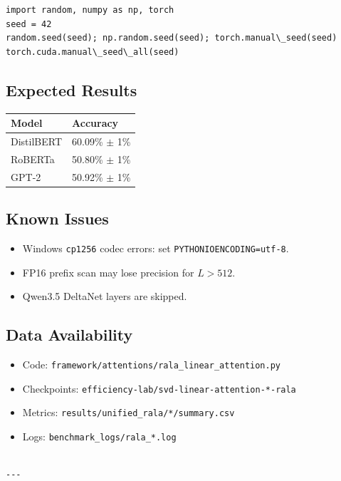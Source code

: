 \begin{lstlisting}
import random, numpy as np, torch
seed = 42
random.seed(seed); np.random.seed(seed); torch.manual\_seed(seed)
torch.cuda.manual\_seed\_all(seed)
\end{lstlisting}

\subsection{Expected Results}

\begin{table}[H]
\centering
\small
\begin{tabular}{ll}
\toprule
\textbf{Model} & \textbf{Accuracy} \\
\midrule
DistilBERT & 60.09\% $\pm$ 1\% \\
RoBERTa & 50.80\% $\pm$ 1\% \\
GPT-2 & 50.92\% $\pm$ 1\% \\
\bottomrule
\end{tabular}
\end{table}

\subsection{Known Issues}

\begin{itemize}
\item Windows \texttt{cp1256} codec errors: set \texttt{PYTHONIOENCODING=utf-8}.
\item FP16 prefix scan may lose precision for $L > 512$.
\item Qwen3.5 DeltaNet layers are skipped.

\end{itemize}
\subsection{Data Availability}

\begin{itemize}
\item Code: \texttt{framework/attentions/rala\_linear\_attention.py}
\item Checkpoints: \texttt{efficiency-lab/svd-linear-attention-*-rala}
\item Metrics: \texttt{results/unified\_rala/*/summary.csv}
\item Logs: \texttt{benchmark\_logs/rala\_*.log}
\end{itemize}
\begin{lstlisting}

---
\end{lstlisting}

